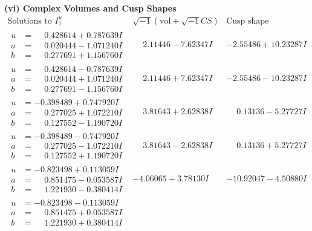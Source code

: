 \documentclass[1p]{elsarticle_modified}
\theoremstyle{definition}
\newcommand{\I}{\sqrt{-1}}
\begin{document}
\newpage\flushleft \textbf{(vi) Complex Volumes and Cusp Shapes}
$$\begin{array}{c|c|c}  
\text{Solutions to }I^u_{1}& \I (\text{vol} + \sqrt{-1}CS) & \text{Cusp shape}\\
 \hline 
\begin{aligned}
u &= \phantom{-}0.428614 + 0.787639 I \\
a &= \phantom{-}0.020444 - 1.071240 I \\
b &= \phantom{-}0.277691 + 1.156760 I\end{aligned}
 & \phantom{-}2.11446 - 7.62347 I & -2.55486 + 10.23287 I \\ \hline\begin{aligned}
u &= \phantom{-}0.428614 - 0.787639 I \\
a &= \phantom{-}0.020444 + 1.071240 I \\
b &= \phantom{-}0.277691 - 1.156760 I\end{aligned}
 & \phantom{-}2.11446 + 7.62347 I & -2.55486 - 10.23287 I \\ \hline\begin{aligned}
u &= -0.398489 + 0.747920 I \\
a &= \phantom{-}0.277025 + 1.072210 I \\
b &= \phantom{-}0.127552 - 1.190720 I\end{aligned}
 & \phantom{-}3.81643 + 2.62838 I & \phantom{-}0.13136 - 5.27727 I \\ \hline\begin{aligned}
u &= -0.398489 - 0.747920 I \\
a &= \phantom{-}0.277025 - 1.072210 I \\
b &= \phantom{-}0.127552 + 1.190720 I\end{aligned}
 & \phantom{-}3.81643 - 2.62838 I & \phantom{-}0.13136 + 5.27727 I \\ \hline\begin{aligned}
u &= -0.823498 + 0.113059 I \\
a &= \phantom{-}0.851475 - 0.053587 I \\
b &= \phantom{-}1.221930 - 0.380414 I\end{aligned}
 & -4.06065 + 3.78130 I & -10.92047 - 4.50880 I \\ \hline\begin{aligned}
u &= -0.823498 - 0.113059 I \\
a &= \phantom{-}0.851475 + 0.053587 I \\
b &= \phantom{-}1.221930 + 0.380414 I\end{aligned}

\end{array}$$
\end{document}
